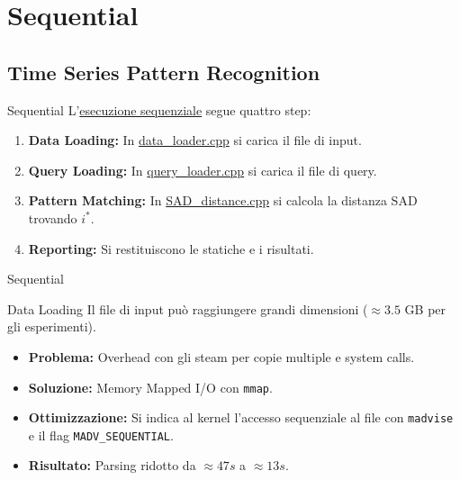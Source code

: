 \section{Sequential}
\subsection{Time Series Pattern Recognition}

\begin{frame}{Sequential}
        L'\href{https://github.com/edoardosarri24/time-series-pattern-recognition/blob/a9dfa266d9fea1eae1e7256da641cce54909b2f5/sequential/src/main.cpp}{esecuzione sequenziale} segue quattro step:
        \begin{enumerate}
            \item \textbf{Data Loading:} In \href{https://github.com/edoardosarri24/time-series-pattern-recognition/blob/253e653c7d69c6c0e1f57485dc770105cea637ee/sequential/src/data_loader.cpp}{data\_loader.cpp} si carica il file di input.
            \item \textbf{Query Loading:} In \href{https://github.com/edoardosarri24/time-series-pattern-recognition/blob/a9dfa266d9fea1eae1e7256da641cce54909b2f5/sequential/src/query_loader.cpp}{query\_loader.cpp} si carica il file di query.
            \item \textbf{Pattern Matching:} In \href{https://github.com/edoardosarri24/time-series-pattern-recognition/blob/22d1be17d6c07ef18f6c2812267295253476a7bd/sequential/src/SAD_distance.cpp}{SAD\_distance.cpp} si calcola la distanza SAD trovando $i^*$.
            \item \textbf{Reporting:} Si restituiscono le statiche e i risultati.
        \end{enumerate}
\end{frame}

\begin{frame}{Sequential}
    \begin{block}{Data Loading}
        Il file di input può raggiungere grandi dimensioni ($\approx 3.5$ GB per gli esperimenti).
        \begin{itemize}
            \item \textbf{Problema:} Overhead con gli steam per copie multiple e system calls.
            \item \textbf{Soluzione:} Memory Mapped I/O  con \texttt{mmap}.
            \item \textbf{Ottimizzazione:} Si indica al kernel l'accesso sequenziale al file con \texttt{madvise} e il flag \texttt{MADV\_SEQUENTIAL}.
            \item \textbf{Risultato:} Parsing ridotto da $\approx 47s$ a $\approx 13s$.
        \end{itemize}
    \end{block}
\end{frame}

